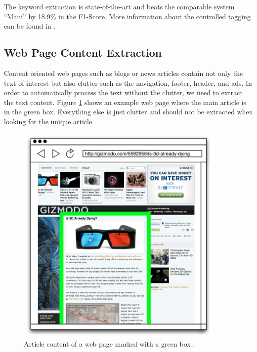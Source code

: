 \documentclass[a4paper,twoside]{book}      %
\begin{document}
The keyword extraction is state-of-the-art and beats the comparable system ``Maui''\cite{medelyan2009human} by 18.9\% in the F1-Score.
More information about the controlled tagging can be found in \cite{katz2010diploma}.

\subsection{Web Page Content Extraction}
Content oriented web pages such as blogs or news articles contain not only the text of interest but also clutter such as the navigation, footer, header, and ads. In order to automatically process the text without the clutter, we need to extract the text content. Figure \ref{fig:webpagecontentextractor} shows an example web page where the main article is in the green box. Everything else is just clutter and should not be extracted when looking for the unique article.

\begin{figure}[ht!]
\centering
\includegraphics[width=4in]{img/webpagecontentextractor.png}
\caption{Article content of a web page marked with a green box  \cite{katz2010diploma}.}
\label{fig:webpagecontentextractor}
\end{figure}
\end{document}
